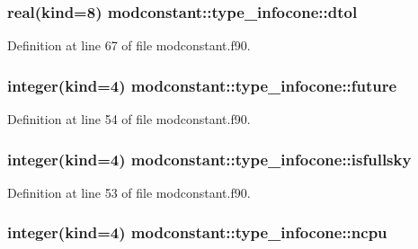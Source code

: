 \subsubsection[{\texorpdfstring{dtol}{dtol}}]{\setlength{\rightskip}{0pt plus 5cm}real(kind=8) modconstant\+::type\+\_\+infocone\+::dtol}\hypertarget{structmodconstant_1_1type__infocone_a97f5dd3ae60da146ad5f2f6f76e60b18}{}\label{structmodconstant_1_1type__infocone_a97f5dd3ae60da146ad5f2f6f76e60b18}


Definition at line 67 of file modconstant.\+f90.

\subsubsection[{\texorpdfstring{future}{future}}]{\setlength{\rightskip}{0pt plus 5cm}integer(kind=4) modconstant\+::type\+\_\+infocone\+::future}\hypertarget{structmodconstant_1_1type__infocone_a1fcb4dfca22f5cdb9979317636506751}{}\label{structmodconstant_1_1type__infocone_a1fcb4dfca22f5cdb9979317636506751}


Definition at line 54 of file modconstant.\+f90.

\subsubsection[{\texorpdfstring{isfullsky}{isfullsky}}]{\setlength{\rightskip}{0pt plus 5cm}integer(kind=4) modconstant\+::type\+\_\+infocone\+::isfullsky}\hypertarget{structmodconstant_1_1type__infocone_adb5bd3dc9f5e4b1ed2b0b10b14c7fe23}{}\label{structmodconstant_1_1type__infocone_adb5bd3dc9f5e4b1ed2b0b10b14c7fe23}


Definition at line 53 of file modconstant.\+f90.

\subsubsection[{\texorpdfstring{ncpu}{ncpu}}]{\setlength{\rightskip}{0pt plus 5cm}integer(kind=4) modconstant\+::type\+\_\+infocone\+::ncpu}\hypertarget{structmodconstant_1_1type__infocone_a2085f6dfc0dfa44c312c1f92021a08c3}{}\label{structmodconstant_1_1type__infocone_a2085f6dfc0dfa44c312c1f92021a08c3}


